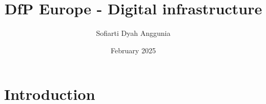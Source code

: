 \documentclass{article}
\title{DfP Europe - Digital infrastructure}
\author{Sofiarti Dyah Anggunia}
\date{February 2025}
\begin{document}
\maketitle

\section{Introduction}
\end{document}
